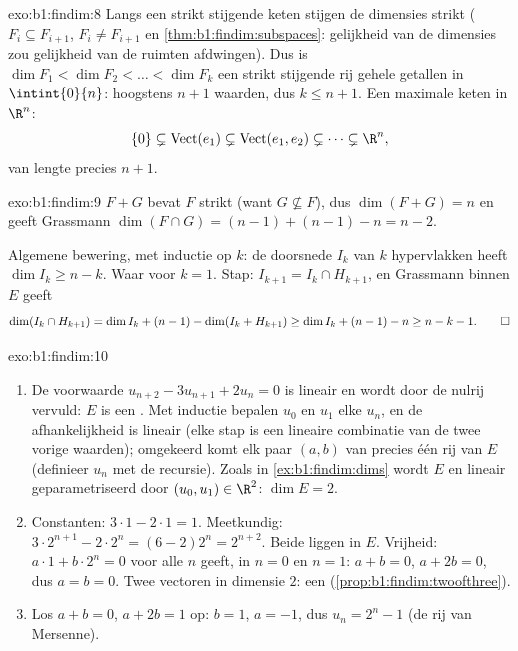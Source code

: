 \begin{solution}{exo:b1:findim:8}
Langs een strikt stijgende keten stijgen de dimensies strikt ($F_i
\subseteq F_{i+1}$, $F_i \neq F_{i+1}$ en
\cref{thm:b1:findim:subspaces}: gelijkheid van de dimensies zou
gelijkheid van de ruimten afdwingen). Dus is $\dim F_1 < \dim F_2 <
\dots < \dim F_k$ een strikt stijgende rij gehele getallen in
$\intint{0}{n}$: hoogstens $n + 1$ waarden, dus $k \leq n + 1$. Een
maximale keten in $\R^n$:
\[
\{0\} \subsetneq \operatorname{Vect}(e_1) \subsetneq
\operatorname{Vect}(e_1, e_2) \subsetneq \dots \subsetneq \R^n ,
\]
van lengte precies $n + 1$.
\end{solution}

\begin{solution}{exo:b1:findim:9}
$F + G$ bevat $F$ strikt (want $G \not\subseteq F$), dus $\dim(F +
G) = n$ en geeft Grassmann $\dim(F \cap G) = (n-1) + (n-1) - n = n -
2$.

Algemene bewering, met inductie op $k$: de doorsnede $I_k$ van $k$
hypervlakken heeft $\dim I_k \geq n - k$. Waar voor $k = 1$. Stap:
$I_{k+1} = I_k \cap H_{k+1}$, en Grassmann binnen $E$ geeft
\[
\dim(I_k \cap H_{k+1}) = \dim I_k + (n - 1) - \dim(I_k + H_{k+1})
\geq \dim I_k + (n-1) - n \geq n - k - 1 . \qedhere
\]
\end{solution}

\begin{solution}{exo:b1:findim:10}
\begin{enumerate}
  \item De voorwaarde $u_{n+2} - 3u_{n+1} + 2u_n = 0$ is lineair en
        wordt door de nulrij vervuld: $E$ is een . Met
        inductie bepalen $u_0$ en $u_1$ elke $u_n$, en de
        afhankelijkheid is lineair (elke stap is een lineaire
        combinatie van de twee vorige waarden); omgekeerd komt elk
        paar $(a, b)$ van precies één rij van $E$ (definieer $u_n$
        met de recursie). Zoals in \cref{ex:b1:findim:dims} wordt
        $E$  en lineair geparametriseerd door $(u_0, u_1)
        \in \R^2$: $\dim E = 2$.
  \item Constanten: $3\cdot1 - 2\cdot1 = 1$. Meetkundig: $3\cdot
        2^{n+1} - 2\cdot 2^n = (6 - 2)2^n = 2^{n+2}$. Beide liggen
        in $E$. Vrijheid: $a\cdot 1 + b\cdot 2^n = 0$ voor alle $n$
        geeft, in $n = 0$ en $n = 1$: $a + b = 0$, $a + 2b = 0$, dus
        $a = b = 0$. Twee  vectoren in dimensie $2$: een 
        (\cref{prop:b1:findim:twoofthree}).
  \item Los $a + b = 0$, $a + 2b = 1$ op: $b = 1$, $a = -1$, dus
        $u_n = 2^n - 1$ (de rij van Mersenne).
\end{enumerate}
\end{solution}

